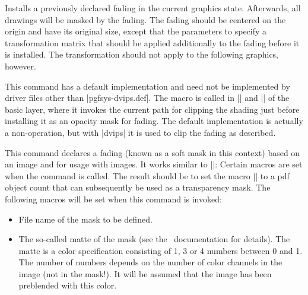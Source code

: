 \begin{command}{\pgfsys@usefading{}}
    Installs a previously declared fading  in the current graphics
    state. Afterwards, all drawings will be masked by the fading. The fading
    should be centered on the origin and have its original size, except that
    the parameters  to  specify a transformation matrix that
    should be applied additionally to the fading before it is installed. The
    transformation should not apply to the following graphics, however.
\end{command}

\begin{command}{\pgfsys@clipfading}
    This command has a default implementation and need not be implemented by
    driver files other than |pgfsys-dvips.def|. The macro is called
    in |\pgfsetfadingforcurrentpath| and |\pgfsetfadingforcurrentpathstroked|
    of the basic layer, where it invokes the current path for clipping the
    shading just before installing it as an opacity mask for fading. The
    default implementation is actually a non-operation, but with |dvips| it
    is used to clip the fading as described.
\end{command}

\begin{command}{\pgfsys@definemask}
    This command declares a fading (known as a soft mask in this context) based
    on an image and for usage with images. It works similar to
    |\pgfsys@defineimage|: Certain macros are set when the command is called.
    The result should be to set the macro |\pgf@mask| to a pdf object count
    that can subsequently be used as a transparency mask. The following macros
    will be set when this command is invoked:
    \begin{itemize}
        \item \declare{|\pgf@filename|}
            File name of the mask to be defined.
        \item \declare{|\pgf@maskmatte|}
            The so-called matte of the mask (see the \pdf\ documentation for
            details). The matte is a color specification consisting of 1, 3 or
            4 numbers between 0 and 1. The number of numbers depends on the
            number of color channels in the image (not in the mask!). It will
            be assumed that the image has been preblended with this color.
    \end{itemize}
\end{command}


